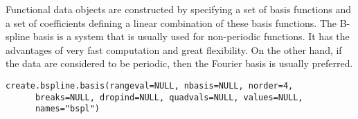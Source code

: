 \documentclass{article}
\begin{document}
\begin{Description}\relax
Functional data objects are constructed by specifying a set of basis 
functions and a set of coefficients defining a linear combination of
these basis functions.  The B-spline basis is a system that is usually
used for non-periodic functions.  It has the advantages of very fast
computation and great flexibility.  On the other hand, if the data are
considered to be periodic, then the Fourier basis is usually
preferred.
\end{Description}
\begin{Usage}
\begin{verbatim}
create.bspline.basis(rangeval=NULL, nbasis=NULL, norder=4,
      breaks=NULL, dropind=NULL, quadvals=NULL, values=NULL,
      names="bspl") 
\end{verbatim}
\end{Usage}
\end{document}
